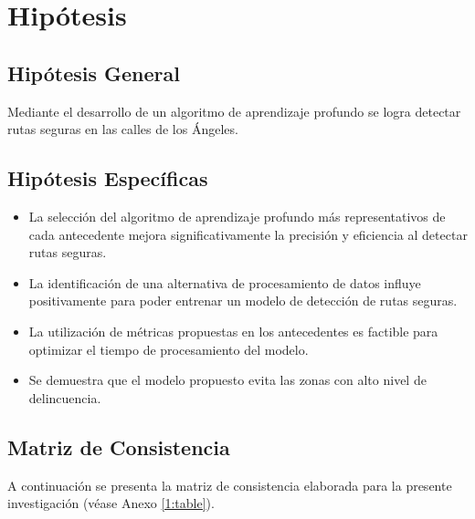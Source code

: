 \section{Hipótesis}

\subsection{Hipótesis General}
\newcommand{\HipotesisGeneral}{
Mediante el desarrollo de un algoritmo de aprendizaje profundo se logra detectar rutas seguras en las calles de los Ángeles.
}
\HipotesisGeneral
\subsection{Hipótesis Específicas}
\newcommand{\Hone}{
La selección del algoritmo de aprendizaje profundo más representativos de cada antecedente mejora significativamente la precisión y eficiencia al detectar rutas seguras.
}
\newcommand{\Htwo}{
La identificación de una alternativa de procesamiento de datos influye positivamente para poder entrenar un modelo de detección de rutas seguras.
}
\newcommand{\Hthree}{
La utilización de métricas propuestas en los antecedentes es factible para optimizar el tiempo de procesamiento del modelo.	
}
\newcommand{\Hfour}{
Se demuestra que el modelo propuesto evita las zonas con alto nivel de delincuencia.
}
\begin{itemize}
	\item \Hone
	\item \Htwo
	\item \Hthree
	\item \Hfour
\end{itemize}

\subsection{Matriz de Consistencia}
A continuación se presenta la matriz de consistencia elaborada para la presente investigación (véase Anexo \ref{1:table}).

